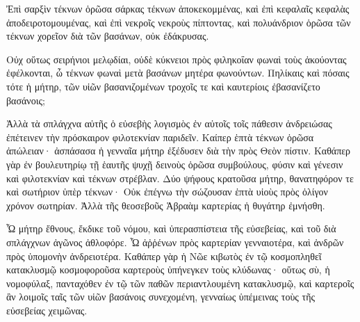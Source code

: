 {Ἐπὶ σαρξὶν τέκνων ὁρῶσα σάρκας τέκνων ἀποκεκομμένας, καὶ ἐπὶ κεφαλαῖς κεφαλὰς ἀποδειροτομουμένας, καὶ ἐπὶ νεκροῖς νεκροὺς πίπτοντας, καὶ πολυάνδριον ὁρῶσα τῶν τέκνων χορεῖον διὰ τῶν βασάνων, οὐκ ἐδάκρυσας.
\par }{\PP {}Οὐχ οὕτως σειρήνιοι μελῳδίαι, οὐδὲ κύκνειοι πρὸς φιληκοΐαν φωναὶ τοὺς ἀκούοντας ἐφέλκονται, ὦ τέκνων φωναὶ μετὰ βασάνων μητέρα φωνούντων.
Πηλίκαις καὶ πόσαις τότε ἡ μήτηρ, τῶν υἱῶν βασανιζομένων τροχοῖς τε καὶ καυτερίοις ἐβασανίζετο βασάνοις;
\par }{\PP {}Ἀλλὰ τὰ σπλάγχνα αὐτῆς ὁ εὐσεβὴς λογισμὸς ἐν αὐτοῖς τοῖς πάθεσιν ἀνδρειώσας ἐπέτεινεν τὴν πρόσκαιρον φιλοτεκνίαν παριδεῖν.
Καίπερ ἑπτὰ τέκνων ὁρῶσα ἀπώλειαν· ἀσπάσασα ἡ γενναῖα μήτηρ ἐξέδυσεν διὰ τὴν πρὸς Θεὸν πίστιν.
Καθάπερ γὰρ ἐν βουλευτηρίῳ τῇ ἑαυτῆς ψυχῇ δεινοὺς ὁρῶσα συμβούλους, φύσιν καὶ γένεσιν καὶ φιλοτεκνίαν καὶ τέκνων στρέβλαν.
Δύο ψήφους κρατοῦσα μήτηρ, θανατηφόρον τε καὶ σωτήριον ὑπὲρ τέκνων·
Οὐκ ἐπέγνω τὴν σώζουσαν ἑπτὰ υἱοὺς πρὸς ὀλίγον χρόνον σωτηρίαν.
Ἀλλὰ τῆς θεοσεβοῦς Ἁβραὰμ καρτερίας ἡ θυγάτηρ ἐμνήσθη.
\par }{\PP {}Ὦ μήτηρ ἔθνους, ἔκδικε τοῦ νόμου, καὶ ὑπερασπίστεια τῆς εὐσεβείας, καὶ τοῦ διὰ σπλάγχνων ἀγῶνος ἀθλοφόρε.
Ὦ ἀῤῥένων πρὸς καρτερίαν γενναιοτέρα, καὶ ἀνδρῶν πρὸς ὑπομονὴν ἀνδρειοτέρα.
Καθάπερ γὰρ ἡ Νῶε κιβωτὸς ἐν τῷ κοσμοπληθεῖ κατακλυσμῷ κοσμοφοροῦσα καρτεροὺς ὑπήνεγκεν τοὺς κλύδωνας·
οὕτως σὺ, ἡ νομοφύλαξ, πανταχόθεν ἐν τῷ τῶν παθῶν περιαντλουμένη κατακλυσμῷ, καὶ καρτεροῖς ἂν λοιμοῖς ταῖς τῶν υἱῶν βασάνοις συνεχομένη, γενναίως ὑπέμεινας τοὺς τῆς εὐσεβείας χειμῶνας.

}
